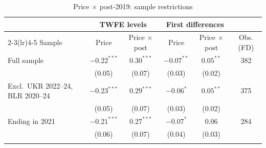 \documentclass[pdflatex,sn-basic]{sn-jnl}
\begin{document}
\begin{table}[h]
\caption{Price $\times$ post-2019: sample restrictions}\label{tab:S3}
\footnotesize
\begin{tabular*}{\textwidth}{@{\extracolsep{\fill}}lccccc@{}}
\toprule
& \multicolumn{2}{c}{TWFE levels} & \multicolumn{2}{c}{First differences} & \\
\cmidrule(lr){2-3}\cmidrule(lr){4-5}
Sample & Price & Price $\times$ post & Price & Price $\times$ post & Obs. (FD)\\
\midrule
Full sample & $-0.22^{***}$ & $0.30^{***}$ & $-0.07^{**}$ & $0.05^{**}$ & 382\\
 & (0.05) & (0.07) & (0.03) & (0.02) & \\
Excl.\ UKR 2022--24, BLR 2020--24 & $-0.23^{***}$ & $0.29^{***}$ & $-0.06^{*}$ & $0.05^{**}$ & 375\\
 & (0.05) & (0.07) & (0.03) & (0.02) & \\
Ending in 2021 & $-0.21^{***}$ & $0.27^{***}$ & $-0.07^{*}$ & $0.06$ & 284\\
 & (0.06) & (0.07) & (0.04) & (0.03) & \\
\botrule
\end{tabular*}
\end{table}
\end{document}
